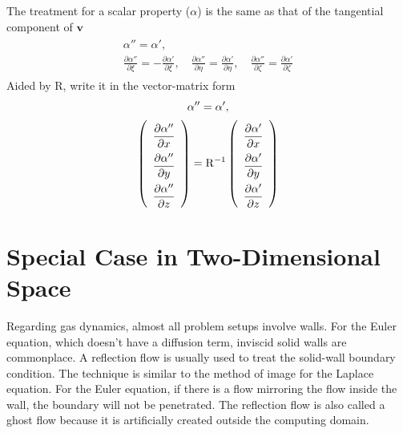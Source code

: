 \documentclass[a4paper,12pt,dvips]{article}
\begin{document}
The treatment for a scalar property ($\alpha$) is the same as that of the
tangential component of $\mathbf{v}$
\begin{align*}
\begin{gathered}
  \alpha'' = \alpha', \\
  \frac{\partial \alpha''}{\partial\xi} =
  -\frac{\partial \alpha'}{\partial\xi}, \quad
  \frac{\partial \alpha''}{\partial\eta} =
  \frac{\partial \alpha'}{\partial\eta}, \quad
  \frac{\partial \alpha''}{\partial\zeta} =
  \frac{\partial \alpha'}{\partial\zeta}
\end{gathered}
\end{align*}
Aided by $\mathrm{R}$, write it in the vector-matrix form
\begin{align*}
\begin{gathered}
  \alpha'' = \alpha', \\
  \renewcommand{\arraystretch}{2.2}
  \left(\begin{array}{c}
    \dfrac{\partial\alpha''}{\partial x} \\
    \dfrac{\partial\alpha''}{\partial y} \\
    \dfrac{\partial\alpha''}{\partial z} \\
  \end{array}\right)
  = \mathrm{R}^{-1}
  \left(\begin{array}{c}
    \dfrac{\partial\alpha'}{\partial x} \\
    \dfrac{\partial\alpha'}{\partial y} \\
    \dfrac{\partial\alpha'}{\partial z} \\
  \end{array}\right)
\end{gathered}
\end{align*}

\section{Special Case in Two-Dimensional Space}

Regarding gas dynamics, almost all problem setups involve walls.  For the Euler
equation, which doesn't have a diffusion term, inviscid solid walls are
commonplace.  A reflection flow is usually used to treat the solid-wall
boundary condition\cite{laney_computational_1998}.  The technique is similar to
the method of image for the Laplace equation.  For the Euler equation, if there
is a flow mirroring the flow inside the wall, the boundary will not be
penetrated.  The reflection flow is also called a ghost flow because it is
artificially created outside the computing domain.
\end{document}
